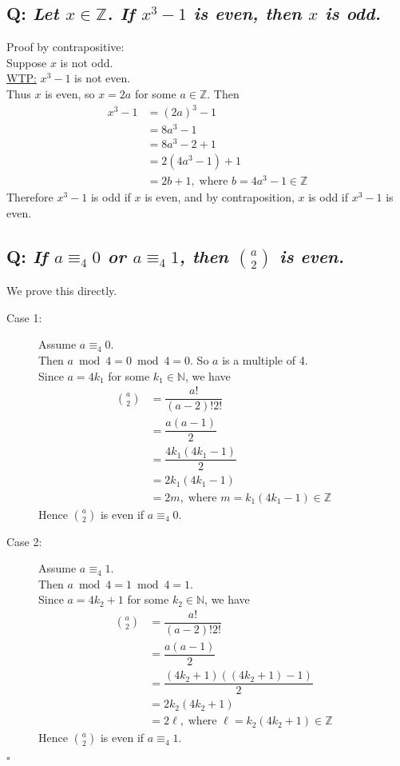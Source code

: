 \documentclass{article}
\begin{document}
\subsection*{Q: {\em Let $x\in\mathbb{Z}$. If $x^3-1$ is even, then $x$ is odd.}}

Proof by contrapositive:\\[1ex]
Suppose $x$ is not odd.\\
\underline{WTP:} $x^3-1$ is not even.\\[1ex]
Thus $x$ is even, so $x = 2 a$ for some $a\in\mathbb{Z}$. Then
\begin{align*}
x^3 - 1&= (2 a )^3 - 1\\
&= 8 a^3 - 1\\
&= 8 a^3 - 2 + 1\\
&= 2(4 a^3 - 1) + 1\\
&=2 b + 1,\;\text{where $b = 4 a^3 - 1 \in\mathbb{Z}$}
\end{align*} 
Therefore $x^3-1$ is odd if $x$ is even, and by contraposition, $x$ is odd if $x^3-1$ is even.

\subsection*{Q: {\em If $a\equiv_4 0$ or $a\equiv_4 1$, then $\binom{a}{2}$ is even.}}

We prove this directly.
\begin{description}
\item[Case 1:] Assume $a\equiv_4 0$.\\
Then $a\bmod 4=0\bmod 4=0$. So $a$ is a multiple of 4.\\
Since $a = 4 k_1$ for some $k_1 \in\mathbb{N}$, we have
\begin{align*}
\binom{a}{2}&=\dfrac{a!}{(a-2)!2!}\\
&=\dfrac{a(a-1)}{2}\\
&=\dfrac{4k_1(4k_1-1)}{2}\\
&=2k_1(4k_1-1)\\
&=2m,\;\text{where $m=k_1(4k_1-1)\in\mathbb{Z}$}
\end{align*}
Hence $\binom{a}{2}$ is even if $a\equiv_4 0$.
\item[Case 2:]Assume $a\equiv_4 1$.\\
Then $a\bmod 4=1\bmod 4=1$.\\
Since $a = 4 k_2+1$ for some $k_2 \in\mathbb{N}$, we have
\begin{align*}
\binom{a}{2}&=\dfrac{a!}{(a-2)!2!}\\
&=\dfrac{a(a-1)}{2}\\
&=\dfrac{(4k_2+1)((4k_2+1)-1)}{2}\\
&=2k_2(4k_2+1)\\
&=2\ell,\;\text{where $\ell=k_2(4k_2+1)\in\mathbb{Z}$}
\end{align*}
Hence $\binom{a}{2}$ is even if $a\equiv_4 1$.
\end{description}
$\square$
\end{document}
